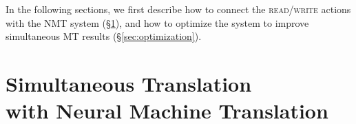 In the following sections, we first describe how to connect the \textsc{read}/\textsc{write} actions with the NMT system (\S\ref{sec:framework}), and how to optimize the system to improve simultaneous MT results (\S\ref{sec:optimization}).



\section{Simultaneous Translation \\ with Neural Machine Translation}
\label{sec:framework}

